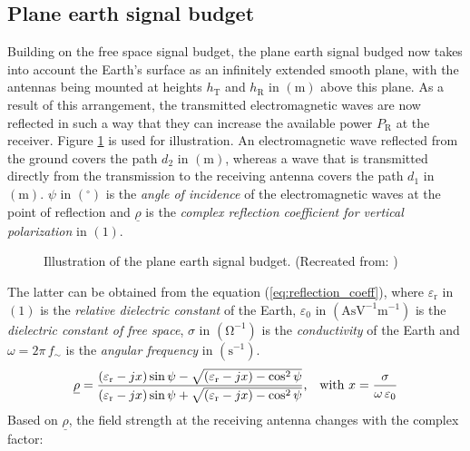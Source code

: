 \subsection{Plane earth signal budget} \label{sec:pepl}
Building on the free space signal budget, the plane earth signal budged now takes into account the Earth's surface as an infinitely extended smooth plane, with the antennas being mounted at heights $h_\mathrm{T}$ and $h_\mathrm{R}$ in $\left(\mathrm{m}\right)$ above this plane. As a result of this arrangement, the transmitted electromagnetic waves are now reflected in such a way that they can increase the available power $P_\mathrm{R}$ at the receiver. Figure \ref{fig:tikz_plane_earth_signal_budget} is used for illustration. An electromagnetic wave reflected from the ground covers the path $d_2$ in $\left(\mathrm{m}\right)$, whereas a wave that is transmitted directly from the transmission to the receiving antenna covers the path $d_1$ in $\left(\mathrm{m}\right)$. $\psi$ in $\left(^\circ\right)$ is the \emph{angle of incidence} of the electromagnetic waves at the point of reflection and $\underline{\rho}$ is the \emph{complex reflection coefficient for vertical polarization} in $\left(\mathrm{1}\right)$.
\begin{figure}[h!]
	\centering
	
	\caption{Illustration of the plane earth signal budget. (Recreated from: \cite{Parsons:2000, Glover:2010, Goiser:2019})}
	\label{fig:tikz_plane_earth_signal_budget}
\end{figure}
The latter can be obtained from the equation (\ref{eq:reflection_coeff}), where $\varepsilon_\mathrm{r}$ in $\left(1\right)$ is the \emph{relative dielectric constant} of the Earth, $\varepsilon_\mathrm{0}$ in $\left(\mathrm{AsV^{-1}m^{-1}}\right)$ is the \emph{dielectric constant of free space}, $\sigma$ in $\left(\mathrm{\Omega^{-1}}\right)$ is the \emph{conductivity} of the Earth and $\omega = 2\pi \, f_\sim$ is the \emph{angular frequency} in $\left(\mathrm{s^{-1}}\right)$.
\begin{equation} \label{eq:reflection_coeff}
	\centering
	\underline{\rho} = \dfrac{\left(\varepsilon_\mathrm{r} - jx \right) \sin \psi - \sqrt{\left(\varepsilon_\mathrm{r} - jx \right) - \cos^2 \psi}}{\left(\varepsilon_\mathrm{r} - jx \right) \sin \psi + \sqrt{\left(\varepsilon_\mathrm{r} - jx \right) - \cos^2 \psi}}\text{,} \quad \text{with } x = \dfrac{\sigma}{\omega \, \varepsilon_0}
\end{equation}
Based on $\underline{\rho}$, the field strength at the receiving antenna changes with the complex factor:
